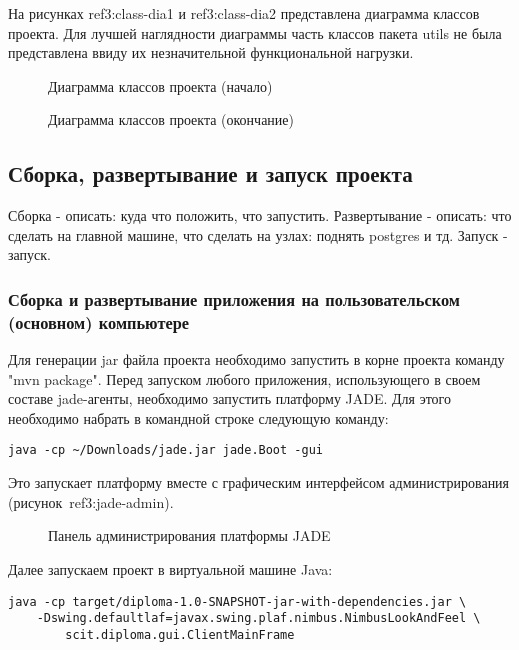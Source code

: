 На рисунках ref{3:class-dia1} и ref{3:class-dia2} представлена диаграмма классов проекта. Для лучшей наглядности диаграммы часть классов пакета utils не была представлена ввиду их незначительной функциональной нагрузки.

\begin{figure}[h]
\caption{Диаграмма классов проекта (начало)}
\label{3:class-dia1}
\end{figure}

\begin{figure}[h]
\caption{Диаграмма классов проекта (окончание)}
\label{3:class-dia2}
\end{figure}

\subsection{Сборка, развертывание и запуск проекта}
Сборка - описать: куда что положить, что запустить.
Развертывание - описать: что сделать на главной машине, что сделать на узлах: поднять postgres и тд.
Запуск - запуск.

\subsubsection{Сборка и развертывание приложения на пользовательском (основном) компьютере}
Для генерации jar файла проекта необходимо запустить в корне проекта команду "mvn package". 
Перед запуском любого приложения, использующего в своем составе jade-агенты, необходимо запустить платформу JADE. Для этого необходимо набрать в командной строке следующую команду:
\begin{verbatim}
java -cp ~/Downloads/jade.jar jade.Boot -gui
\end{verbatim}
Это запускает платформу вместе с графическим интерфейсом администрирования (рисунок~ref{3:jade-admin}).
\begin{figure}[h]
\caption{Панель администрирования платформы JADE}
\label{3:jade-admin}
\end{figure}

Далее запускаем проект в виртуальной машине Java:
\begin{verbatim}
java -cp target/diploma-1.0-SNAPSHOT-jar-with-dependencies.jar \
    -Dswing.defaultlaf=javax.swing.plaf.nimbus.NimbusLookAndFeel \
        scit.diploma.gui.ClientMainFrame
\end{verbatim}

